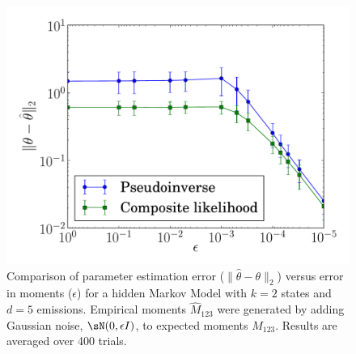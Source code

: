 \begin{figure}
  \centering
  \includegraphics[width=0.8\columnwidth]{figures/asymp-k2d5.pdf}
  \caption{
  Comparison of parameter estimation error ($\|\hat \theta
    - \theta\|_2$) versus error in moments ($\epsilon$) for a hidden
    Markov Model with $k=2$ states and $d=5$ emissions.
  Empirical moments $\widehat M_{123}$ were generated by adding Gaussian
    noise, $\sN(0,\epsilon I)$, to expected moments $M_{123}$.
  Results are averaged over 400 trials.}
    \label{fig:cl-hmm}
\end{figure}
